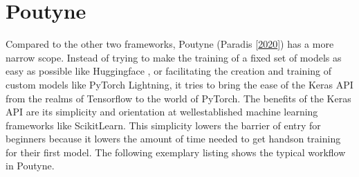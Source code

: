 \documentclass[letterpaper,10pt,english]{jupyterBook}
\begin{document}
\chapter{Poutyne}
\label{\detokenize{Poutyne:poutyne}}\label{\detokenize{Poutyne::doc}}
\sphinxAtStartPar
Compared to the other two frameworks, Poutyne (Paradis  {[}\hyperlink{cite.Bibliography:id5}{2020}{]}) has a more narrow scope.
Instead of trying to make the training of a fixed set of models as easy as possible like Huggingface , or facilitating the creation and training of custom models like PyTorch Lightning, it tries to bring the ease of the Keras API from the realms of Tensorflow to the world of PyTorch.
The benefits of the Keras API are its simplicity and orientation at well\sphinxhyphen{}established machine learning frameworks like Scikit\sphinxhyphen{}Learn.
This simplicity lowers the barrier of entry for beginners because it lowers the amount of time needed to get hands\sphinxhyphen{}on training for their first model.
The following exemplary listing shows the typical workflow in Poutyne.
\end{document}
